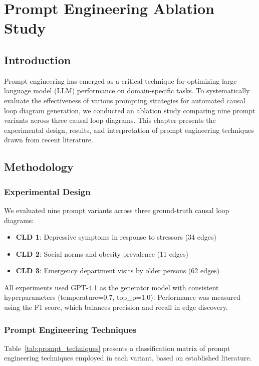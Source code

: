\chapter{Prompt Engineering Ablation Study}
\label{ch:ablation}

\section{Introduction}

Prompt engineering has emerged as a critical technique for optimizing large language model (LLM) performance on domain-specific tasks. To systematically evaluate the effectiveness of various prompting strategies for automated causal loop diagram generation, we conducted an ablation study comparing nine prompt variants across three causal loop diagrams. This chapter presents the experimental design, results, and interpretation of prompt engineering techniques drawn from recent literature.

\section{Methodology}

\subsection{Experimental Design}

We evaluated nine prompt variants across three ground-truth causal loop diagrams:
\begin{itemize}
    \item \textbf{CLD 1}: Depressive symptoms in response to stressors (34 edges)
    \item \textbf{CLD 2}: Social norms and obesity prevalence (11 edges)
    \item \textbf{CLD 3}: Emergency department visits by older persons (62 edges)
\end{itemize}

All experiments used GPT-4.1 as the generator model with consistent hyperparameters (temperature=0.7, top\_p=1.0). Performance was measured using the F1 score, which balances precision and recall in edge discovery.

\subsection{Prompt Engineering Techniques}

Table~\ref{tab:prompt_techniques} presents a classification matrix of prompt engineering techniques employed in each variant, based on established literature.

